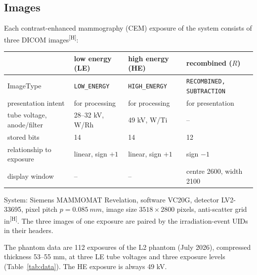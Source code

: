 \documentclass[11pt,a4paper]{article}
\newcommand{\Hd}{\textsuperscript{[H]}}
\newcommand{\code}[1]{\texttt{#1}}
\begin{document}
\subsection{Images}
Each contrast-enhanced mammography (CEM) exposure of the system consists of three DICOM images\Hd:
\begin{center}\small
\begin{tabular}{llll}
\toprule
 & low energy (LE) & high energy (HE) & recombined ($R$) \\
\midrule
ImageType & \code{LOW\_ENERGY} & \code{HIGH\_ENERGY} & \code{RECOMBINED, SUBTRACTION} \\
presentation intent & for processing & for processing & for presentation \\
tube voltage, anode/filter & 28--32 kV, W/Rh & 49 kV, W/Ti & -- \\
stored bits & 14 & 14 & 12 \\
relationship to exposure & linear, sign $+1$ & linear, sign $+1$ & sign $-1$ \\
display window & -- & -- & centre 2600, width 2100 \\
\bottomrule
\end{tabular}
\end{center}
System: Siemens MAMMOMAT Revelation, software VC20G, detector LV2-33695, pixel pitch $p=\SI{0.085}{mm}$, image size
$3518\times2800$ pixels, anti-scatter grid in\Hd. The three images of one exposure are paired by the irradiation-event
UIDs in their headers.

The phantom data are 112 exposures of the L2 phantom (July 2026), compressed thickness 53--55 mm, at three LE tube
voltages and three exposure levels (Table~\ref{tab:data}). The HE exposure is always 49 kV.
\end{document}
